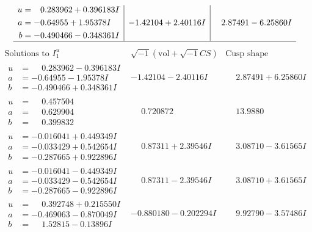\documentclass[1p]{elsarticle_modified}
\theoremstyle{definition}
\newcommand{\I}{\sqrt{-1}}
\begin{document}
$$\begin{array}{c|c|c}
\begin{aligned}
u &= \phantom{-}0.283962 + 0.396183 I \\
a &= -0.64955 + 1.95378 I \\
b &= -0.490466 - 0.348361 I\end{aligned}
 & -1.42104 + 2.40116 I & \phantom{-}2.87491 - 6.25860 I\\
 \hline 
 \end{array}$$\newpage$$\begin{array}{c|c|c}  
\text{Solutions to }I^u_{1}& \I (\text{vol} + \sqrt{-1}CS) & \text{Cusp shape}\\
 \hline 
\begin{aligned}
u &= \phantom{-}0.283962 - 0.396183 I \\
a &= -0.64955 - 1.95378 I \\
b &= -0.490466 + 0.348361 I\end{aligned}
 & -1.42104 - 2.40116 I & \phantom{-}2.87491 + 6.25860 I \\ \hline\begin{aligned}
u &= \phantom{-}0.457504\phantom{ +0.000000I} \\
a &= \phantom{-}0.629904\phantom{ +0.000000I} \\
b &= \phantom{-}0.399832\phantom{ +0.000000I}\end{aligned}
 & \phantom{-}0.720872\phantom{ +0.000000I} & \phantom{-}13.9880\phantom{ +0.000000I} \\ \hline\begin{aligned}
u &= -0.016041 + 0.449349 I \\
a &= -0.033429 + 0.542654 I \\
b &= -0.287665 + 0.922896 I\end{aligned}
 & \phantom{-}0.87311 + 2.39546 I & \phantom{-}3.08710 - 3.61565 I \\ \hline\begin{aligned}
u &= -0.016041 - 0.449349 I \\
a &= -0.033429 - 0.542654 I \\
b &= -0.287665 - 0.922896 I\end{aligned}
 & \phantom{-}0.87311 - 2.39546 I & \phantom{-}3.08710 + 3.61565 I \\ \hline\begin{aligned}
u &= \phantom{-}0.392748 + 0.215550 I \\
a &= -0.469063 - 0.870049 I \\
b &= \phantom{-}1.52815 - 0.13896 I\end{aligned}
 & -0.880180 - 0.202294 I & \phantom{-}9.92790 - 3.57486 I \\ \hline\begin{aligned}

\end{aligned}
\end{array}$$
\end{document}
